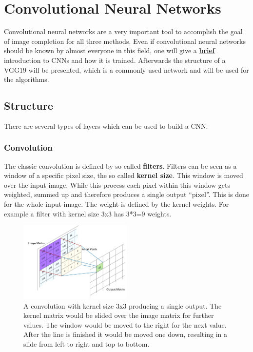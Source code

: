 \documentclass[
     11pt,         %
     a4paper,      %
     oneside,
     ]{article}
\begin{document}
\section{Convolutional Neural Networks}
Convolutional neural networks are a very important tool to accomplish the goal of image completion for all three methods. Even if convolutional neural networks should be known by almost everyone in this field, one will give a \underline{\textbf{brief}} introduction to CNNs and how it is trained. Afterwards the structure of a VGG19 will be presented, which is a commonly used network and will be used for the algorithms.
\subsection{Structure}
There are several types of layers which can be used to build a CNN.
\subsubsection{Convolution}
The classic convolution is defined by so called \textbf{filters}. Filters can be seen as a window of a specific pixel size, the so called \textbf{kernel size}. This window is moved over the input image. While this process each pixel within this window gets weighted, summed up and therefore produces a single output \enquote{pixel}. This is done for the whole input image. The weight is defined by the kernel weights. For example a filter with kernel size 3x3 has 3*3=9 weights.
\begin{figure}[H]
  \begin{center}
    \includegraphics[width=0.5\textwidth]{images/1.JPG}
    \caption{A convolution with kernel size 3x3 producing a single output. The kernel matrix would be slided over the image matrix for further values. The window would be moved to the right for the next value. After the line is finished it would be moved one down, resulting in a slide from left to right and top to bottom.}
    \label{fig:conv}
  \end{center}
\end{figure}
\end{document}
